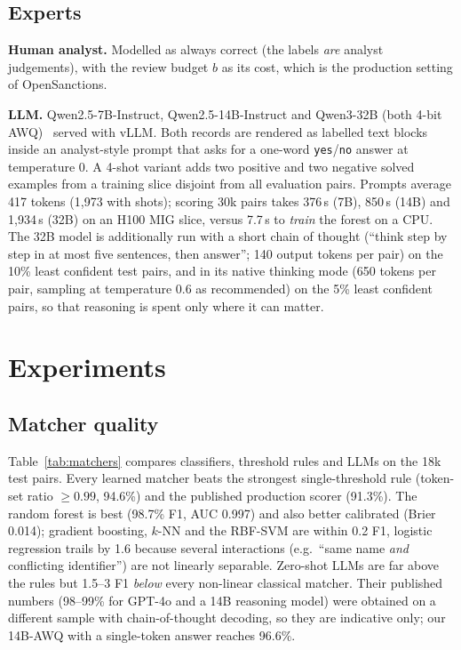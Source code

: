\documentclass[conference]{IEEEtran}
\begin{document}
\subsection{Experts}
\textbf{Human analyst.} Modelled as always correct (the labels \emph{are} analyst judgements), with the review budget $b$ as its cost, which is the production setting of OpenSanctions.

\textbf{LLM.} Qwen2.5-7B-Instruct, Qwen2.5-14B-Instruct and Qwen3-32B (both 4-bit AWQ)~\cite{qwen2025} served with vLLM. Both records are rendered as labelled text blocks inside an analyst-style prompt that asks for a one-word \texttt{yes}/\texttt{no} answer at temperature 0. A 4-shot variant adds two positive and two negative solved examples from a training slice disjoint from all evaluation pairs. Prompts average 417 tokens (1{,}973 with shots); scoring 30k pairs takes 376\,s (7B), 850\,s (14B) and 1{,}934\,s (32B) on an H100 MIG slice, versus 7.7\,s to \emph{train} the forest on a CPU. The 32B model is additionally run with a short chain of thought (``think step by step in at most five sentences, then answer''; 140 output tokens per pair) on the 10\% least confident test pairs, and in its native thinking mode (650 tokens per pair, sampling at temperature 0.6 as recommended) on the 5\% least confident pairs, so that reasoning is spent only where it can matter.

\section{Experiments}
\subsection{Matcher quality}
Table~\ref{tab:matchers} compares classifiers, threshold rules and LLMs on the 18k test pairs. Every learned matcher beats the strongest single-threshold rule (token-set ratio $\ge 0.99$, 94.6\%) and the published production scorer (91.3\%). The random forest is best (98.7\% F1, AUC 0.997) and also better calibrated (Brier 0.014); gradient boosting, $k$-NN and the RBF-SVM are within 0.2 F1, logistic regression trails by 1.6 because several interactions (e.g.\ ``same name \emph{and} conflicting identifier'') are not linearly separable. Zero-shot LLMs are far above the rules but 1.5--3 F1 \emph{below} every non-linear classical matcher. Their published numbers (98--99\% for GPT-4o and a 14B reasoning model) were obtained on a different sample with chain-of-thought decoding, so they are indicative only; our 14B-AWQ with a single-token answer reaches 96.6\%.
\end{document}
